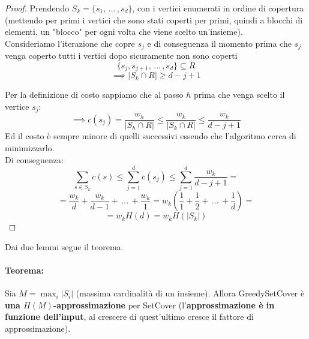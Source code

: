 \begin{proof}
	Prendendo $S_k=\{s_1, \, ... \, , s_d\}$, con i vertici enumerati in ordine di copertura (mettendo per primi i vertici che sono stati coperti per primi, quindi a blocchi di elementi, un "blocco" per ogni volta che viene scelto un'insieme).\\
	
	Consideriamo l'iterazione che copre $s_j$ e di conseguenza il momento prima che $s_j$ venga coperto tutti i vertici dopo sicuramente non sono coperti
	$$ \{s_j , s_{j+1}, \, ... \, , s_d\} \subseteq R $$
	$$ \implies |S_k \cap R| \geq d - j + 1 $$
	
	\newpage
	
	Per la definizione di costo sappiamo che al passo $h$ prima che venga scelto il vertice $s_j$:
	$$ \implies c(s_j)  =\frac{w_h}{|S_h \cap R|} \leq \frac{w_k}{|S_k \cap R|} \leq \frac{w_k}{d-j+1}$$
	Ed il costo è sempre minore di quelli successivi essendo che l'algoritmo cerca di minimizzarlo.\\
	
	Di conseguenza:
	$$ \sum_{s \in S_k} c(s) \leq \sum_{j=1}^d c(s_j)  \leq \sum_{j=1}^d \frac{w_k}{d-j+1} =$$
	$$ = \frac{w_k}{d} + \frac{w_k}{d-1} + \, ... \, + \frac{w_k}{1} = w_k \left(\frac{1}{1} + \frac{1}{2} + \, ... \, + \frac{1}{d} \right) = $$
	$$ = w_k H(d) = w_k H(|S_k|) $$ 
\end{proof}


\newpage

Dai due lemmi segue il teorema.

\paragraph{Teorema:} Sia $M = \max_i |S_i|$ (massima cardinalità di un insieme). Allora GreedySetCover è \textbf{una $H(M)$-approssimazione} per SetCover (l'\textbf{approssimazione è in funzione dell'input}, al crescere di quest'ultimo cresce il fattore di approssimazione). \\

